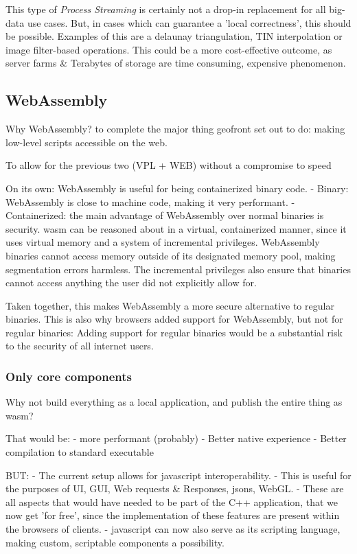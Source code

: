 This type of \emph{Process Streaming} is certainly not a drop-in replacement for all big-data use cases. But, in cases which can guarantee a 'local correctness', this should be possible. Examples of this are a delaunay triangulation, TIN interpolation or image filter-based operations. This could be a more cost-effective outcome, as server farms \& Terabytes of storage are time consuming, expensive phenomenon.

\subsection{WebAssembly}

Why WebAssembly? to complete the major thing geofront set out to do: making low-level scripts accessible on the web. 

To allow for the previous two (VPL + WEB) without a compromise to speed

On its own: WebAssembly is useful for being containerized binary code. 
- Binary: WebAssembly is close to machine code, making it very performant.
- Containerized: the main advantage of WebAssembly over normal binaries is security. wasm can be reasoned about in a virtual, containerized manner, since it uses virtual memory and a system of incremental privileges. WebAssembly binaries cannot access memory outside of its designated memory pool, making segmentation errors harmless. The incremental privileges also ensure that binaries cannot access anything the user did not explicitly allow for. 

Taken together, this makes WebAssembly a more secure alternative to regular binaries. This is also why browsers added support for WebAssembly, but not for regular binaries: Adding support for regular binaries would be a substantial risk to the security of all internet users.



\subsubsection*{Only core components}

Why not build everything as a local application, and publish the entire thing as wasm?

That would be:
- more performant (probably)
- Better native experience
- Better compilation to standard executable

BUT:
- The current setup allows for javascript interoperability. 
  - This is useful for the purposes of UI, GUI, Web requests \& Responses, jsons, WebGL.
  - These are all aspects that would have needed to be part of the C++ application, that we now get 'for free', since the implementation of these features are present within the browsers of clients. 
- javascript can now also serve as its scripting language, making custom, scriptable components a possibility.

